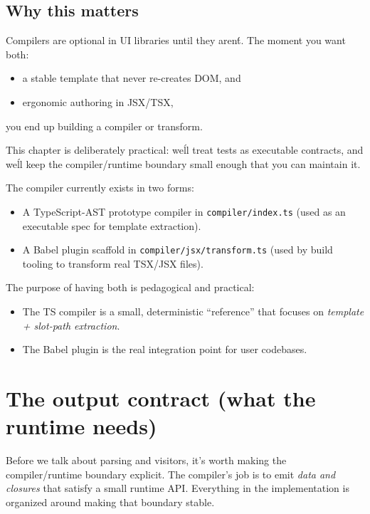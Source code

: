 \subsection*{Why this matters}

Compilers are optional in UI libraries until they aren\'t.
The moment you want both:

\begin{itemize}
\item a stable template that never re-creates DOM, and
\item ergonomic authoring in JSX/TSX,
\end{itemize}

you end up building a compiler or transform.

This chapter is deliberately practical: we\'ll treat tests as executable contracts, and we\'ll keep the compiler/runtime boundary small enough that you can maintain it.

The compiler currently exists in two forms:

\begin{itemize}
\item A TypeScript-AST prototype compiler in \texttt{compiler/index.ts} (used as an executable spec for template extraction).
\item A Babel plugin scaffold in \texttt{compiler/jsx/transform.ts} (used by build tooling to transform real TSX/JSX files).
\end{itemize}

The purpose of having both is pedagogical and practical:

\begin{itemize}
\item The TS compiler is a small, deterministic ``reference'' that focuses on \emph{template + slot-path extraction}.
\item The Babel plugin is the real integration point for user codebases.
\end{itemize}

\section{The output contract (what the runtime needs)}

Before we talk about parsing and visitors, it's worth making the compiler/runtime boundary explicit.
The compiler's job is to emit \emph{data and closures} that satisfy a small runtime API.
Everything in the implementation is organized around making that boundary stable.

